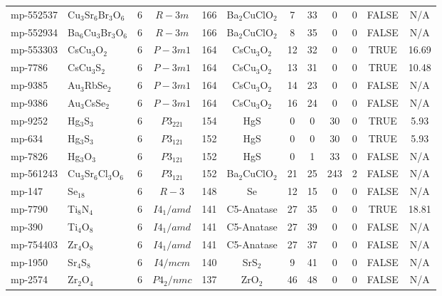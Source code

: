 {\begin{longtable}{llcccccccccc}
    mp-552537 & Cu$_{3}$Sr$_{6}$Br$_{3}$O$_{6}$ & 6     & $R-3m$ & 166   & Ba$_{2}$CuClO$_{2}$ & 7     & 33    & 0     & 0     & FALSE & N/A \\
    mp-552934 & Ba$_{6}$Cu$_{3}$Br$_{3}$O$_{6}$ & 6     & $R-3m$ & 166   & Ba$_{2}$CuClO$_{2}$ & 8     & 35    & 0     & 0     & FALSE & N/A \\
    mp-553303 & CsCu$_{3}$O$_{2}$ & 6     & $P-3m1$ & 164   & CsCu$_{3}$O$_{2}$ & 12    & 32    & 0     & 0     & TRUE  & 16.69  \\
    mp-7786 & CsCu$_{3}$S$_{2}$ & 6     & $P-3m1$ & 164   & CsCu$_{3}$O$_{2}$ & 13    & 31    & 0     & 0     & TRUE  & 10.48  \\
    mp-9385 & Au$_{3}$RbSe$_{2}$ & 6     & $P-3m1$ & 164   & CsCu$_{3}$O$_{2}$ & 14    & 23    & 0     & 0     & FALSE & N/A \\
    mp-9386 & Au$_{3}$CsSe$_{2}$ & 6     & $P-3m1$ & 164   & CsCu$_{3}$O$_{2}$ & 16    & 24    & 0     & 0     & FALSE & N/A \\
    mp-9252 & Hg$_{3}$S$_{3}$ & 6     & $P3_221$ & 154   & HgS   & 0     & 0     & 30    & 0     & TRUE  & 5.93  \\
    mp-634 & Hg$_{3}$S$_{3}$ & 6     & $P3_121$ & 152   & HgS   & 0     & 0     & 30    & 0     & TRUE  & 5.93  \\
    mp-7826 & Hg$_{3}$O$_{3}$ & 6     & $P3_121$ & 152   & HgS   & 0     & 1     & 33    & 0     & FALSE & N/A \\
    mp-561243 & Cu$_{3}$Sr$_{6}$Cl$_{3}$O$_{6}$ & 6     & $P3_121$ & 152   & Ba$_{2}$CuClO$_{2}$ & 21    & 25    & 243   & 2     & FALSE & N/A \\
    mp-147 & Se$_{18}$ & 6     & $R-3$ & 148   & Se    & 12    & 15    & 0     & 0     & FALSE & N/A \\
    mp-7790 & Ti$_{8}$N$_{4}$ & 6     & $I4_1/amd$ & 141   & C5-Anatase & 27    & 35    & 0     & 0     & TRUE  & 18.81  \\
    mp-390 & Ti$_{4}$O$_{8}$ & 6     & $I4_1/amd$ & 141   & C5-Anatase & 27    & 39    & 0     & 0     & FALSE & N/A \\
    mp-754403 & Zr$_{4}$O$_{8}$ & 6     & $I4_1/amd$ & 141   & C5-Anatase & 27    & 37    & 0     & 0     & FALSE & N/A \\
    mp-1950 & Sr$_{4}$S$_{8}$ & 6     & $I4/mcm$ & 140   & SrS$_{2}$ & 9     & 41    & 0     & 0     & FALSE & N/A \\
    mp-2574 & Zr$_{2}$O$_{4}$ & 6     & $P4_2/nmc$ & 137   & ZrO$_{2}$ & 46    & 48    & 0     & 0     & FALSE & N/A \\

\end{longtable}}
